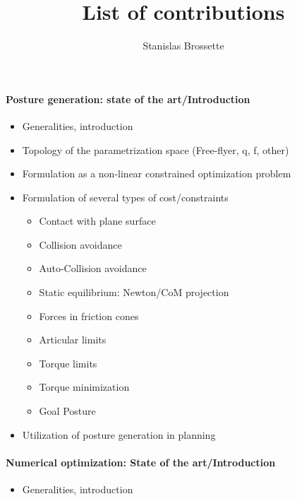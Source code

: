 \documentclass{article}
\begin{document}
\title{List of contributions}
\author{Stanislas Brossette}

\maketitle

\paragraph {Posture generation: state of the art/Introduction}
\begin{itemize}
  \item Generalities, introduction
  \item Topology of the parametrization space (Free-flyer, q, f, other)
  \item Formulation as a non-linear constrained optimization problem
  \item Formulation of several types of cost/constraints
  \begin{itemize}
    \item Contact with plane surface
    \item Collision avoidance
    \item Auto-Collision avoidance
    \item Static equilibrium: Newton/CoM projection
    \item Forces in friction cones
    \item Articular limits
    \item Torque limits
    \item Torque minimization
    \item Goal Posture
  \end{itemize}
  \item  Utilization of posture generation in planning
\end{itemize}

\paragraph {Numerical optimization: State of the art/Introduction}
\begin{itemize}
  \item Generalities, introduction
\end{itemize}
\end{document}
